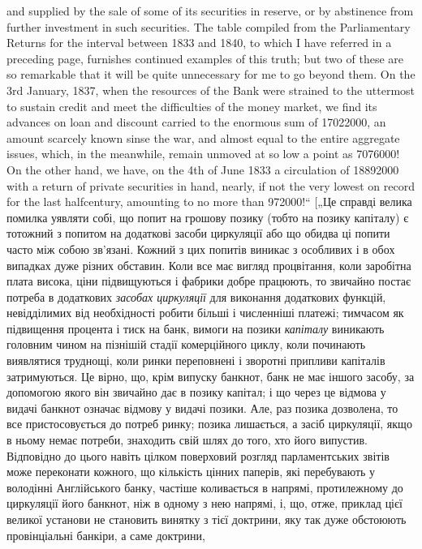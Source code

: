 {and supplied by the sale of some of its securities in reserve, or by abstinence from
further investment in such securities. The table compiled from the Parliamentary
Returns for the interval between 1833 and 1840, to which I have referred in a preceding page,
furnishes continued examples of this truth; but two of these are so
remarkable that it will be quite unnecessary for me to go beyond them. On the
3rd January, 1837, when the resources of the Bank were strained to the uttermost
to sustain credit and meet the difficulties of the money market, we find its advances on loan and
discount carried to the enormous sum of \num{17022000}, an
amount scarcely known sinse the war, and almost equal to the entire aggregate
issues, which, in the meanwhile, remain unmoved at so low a point as \num{7076000}!
On the other hand, we have, on the 4th of June 1833 a circulation of \num{18892000}
with a return of private securities in hand, nearly, if not the very lowest on
record for the last halfcentury, amounting to no more than \num{972000}!“ [„Це справді
велика помилка уявляти собі, що попит на грошову позику (тобто на позику
капіталу) є тотожний з попитом на додаткові засоби циркуляції або що обидва
ці попити часто між собою зв’язані. Кожний з цих попитів виникає з особливих і в обох випадках дуже
різних обставин. Коли все має вигляд процвітання, коли заробітна плата висока, ціни підвищуються і
фабрики добре працюють, то звичайно постає потреба в додаткових \emph{засобах циркуляції} для виконання
додаткових функцій, невідділимих від необхідності робити більші і
численніші платежі; тимчасом як підвищення процента і тиск на банк, вимоги
на позики \emph{капіталу} виникають головним чином на пізнішій стадії комерційного циклу, коли починають
виявлятися труднощі, коли ринки переповнені
і зворотні припливи капіталів затримуються. Це вірно, що, крім випуску банкнот,
банк не має іншого засобу, за допомогою якого він звичайно дає в позику
капітал; і що через це відмова у видачі банкнот означає відмову у видачі позики.
Але, раз позика дозволена, то все пристосовується до потреб ринку; позика
лишається, а засіб циркуляції, якщо в ньому немає потреби, знаходить
свій шлях до того, хто його випустив. Відповідно до цього навіть цілком поверховий
розгляд парламентських звітів може переконати кожного, що кількість
цінних паперів, які перебувають у володінні Англійського банку, частіше коливається
в напрямі, протилежному до циркуляції його банкнот, ніж в одному
з нею напрямі, і, що, отже, приклад цієї великої установи не становить винятку
з тієї доктрини, яку так дуже обстоюють провінціальні банкіри, а саме доктрини,
}
